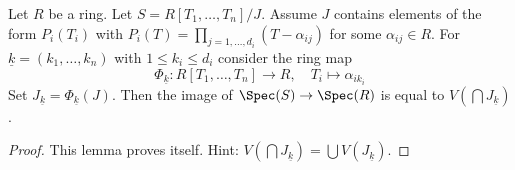 \begin{lemma}
\label{lemma-split-image}
Let $R$ be a ring.
Let $S = R[T_1, \ldots, T_n]/J$.
Assume $J$ contains elements of the form $P_i(T_i)$
with $P_i(T) = \prod_{j = 1, \ldots, d_i} (T - \alpha_{ij})$ for some
$\alpha_{ij} \in R$. For $\underline{k} = (k_1, \ldots, k_n)$
with $1 \leq k_i \leq d_i$ consider the ring map
$$
\Phi_{\underline{k}} : R[T_1, \ldots, T_n] \to R,
\quad
T_i \longmapsto \alpha_{ik_i}
$$
Set $J_{\underline{k}} = \Phi_{\underline{k}}(J)$.
Then the image of $\Spec(S) \to \Spec(R)$ is equal to
$V(\bigcap J_{\underline{k}})$.
\end{lemma}

\begin{proof}
This lemma proves itself. Hint:
$V(\bigcap J_{\underline{k}}) = \bigcup V(J_{\underline{k}})$.
\end{proof}
